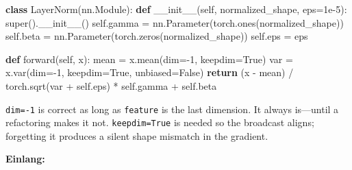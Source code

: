 \documentclass[11pt,titlepage]{article}
\newenvironment{Shaded}{}{}
\newcommand{\BuiltInTok}[1]{#1}
\newcommand{\ControlFlowTok}[1]{\textcolor[rgb]{0.00,0.44,0.13}{\textbf{#1}}}
\newcommand{\DecValTok}[1]{\textcolor[rgb]{0.25,0.63,0.44}{#1}}
\newcommand{\FloatTok}[1]{\textcolor[rgb]{0.25,0.63,0.44}{#1}}
\newcommand{\FunctionTok}[1]{\textcolor[rgb]{0.02,0.16,0.49}{#1}}
\newcommand{\KeywordTok}[1]{\textcolor[rgb]{0.00,0.44,0.13}{\textbf{#1}}}
\newcommand{\NormalTok}[1]{#1}
\newcommand{\OperatorTok}[1]{\textcolor[rgb]{0.40,0.40,0.40}{#1}}
\newcommand{\VariableTok}[1]{\textcolor[rgb]{0.10,0.09,0.49}{#1}}
\begin{document}
\begin{Shaded}
\begin{Highlighting}[]
\KeywordTok{class}\NormalTok{ LayerNorm(nn.Module):}
    \KeywordTok{def} \FunctionTok{__init__}\NormalTok{(}\VariableTok{self}\NormalTok{, normalized_shape, eps}\OperatorTok{=}\FloatTok{1e-5}\NormalTok{):}
        \BuiltInTok{super}\NormalTok{().}\FunctionTok{__init__}\NormalTok{()}
        \VariableTok{self}\NormalTok{.gamma }\OperatorTok{=}\NormalTok{ nn.Parameter(torch.ones(normalized_shape))}
        \VariableTok{self}\NormalTok{.beta }\OperatorTok{=}\NormalTok{ nn.Parameter(torch.zeros(normalized_shape))}
        \VariableTok{self}\NormalTok{.eps }\OperatorTok{=}\NormalTok{ eps}

    \KeywordTok{def}\NormalTok{ forward(}\VariableTok{self}\NormalTok{, x):}
\NormalTok{        mean }\OperatorTok{=}\NormalTok{ x.mean(dim}\OperatorTok{=-}\DecValTok{1}\NormalTok{, keepdim}\OperatorTok{=}\VariableTok{True}\NormalTok{)}
\NormalTok{        var }\OperatorTok{=}\NormalTok{ x.var(dim}\OperatorTok{=-}\DecValTok{1}\NormalTok{, keepdim}\OperatorTok{=}\VariableTok{True}\NormalTok{, unbiased}\OperatorTok{=}\VariableTok{False}\NormalTok{)}
        \ControlFlowTok{return}\NormalTok{ (x }\OperatorTok{-}\NormalTok{ mean) }\OperatorTok{/}\NormalTok{ torch.sqrt(var }\OperatorTok{+} \VariableTok{self}\NormalTok{.eps) }\OperatorTok{*} \VariableTok{self}\NormalTok{.gamma }\OperatorTok{+} \VariableTok{self}\NormalTok{.beta}
\end{Highlighting}
\end{Shaded}

\texttt{dim=-1} is correct as long as \texttt{feature} is the last
dimension. It always is---until a refactoring makes it not.
\texttt{keepdim=True} is needed so the broadcast aligns; forgetting it
produces a silent shape mismatch in the gradient.

\textbf{Einlang:}
\end{document}
